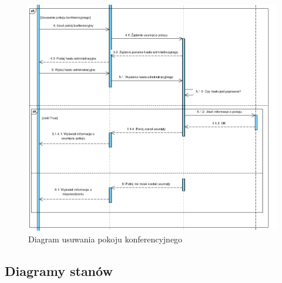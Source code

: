 \documentclass{article}
\begin{document}
	\begin{figure}[H]
		\centering
		\hspace*{-2cm} 
		\includegraphics[scale=0.9]{seq3}
		\caption[]{Diagram usuwania pokoju konferencyjnego}
		\label{fig:seq3}
	\end{figure}
	\subsection{Diagramy stanów}
\end{document}
